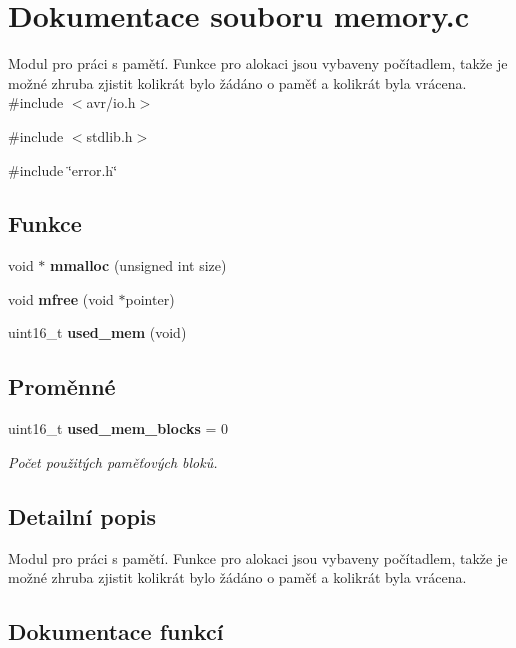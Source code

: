 \section{Dokumentace souboru memory.c}
\label{memory_8c}


Modul pro práci s pamětí. Funkce pro alokaci jsou vybaveny počítadlem, takže je možné zhruba zjistit kolikrát bylo žádáno o paměť a kolikrát byla vrácena.  
{\ttfamily \#include $<$avr/io.h$>$}\par
{\ttfamily \#include $<$stdlib.h$>$}\par
{\ttfamily \#include \char`\"{}error.h\char`\"{}}\par
\subsection*{Funkce}
\begin{DoxyCompactItemize}
\item 
void $\ast$ {\bf mmalloc} (unsigned int size)
\item 
void {\bf mfree} (void $\ast$pointer)
\item 
uint16\_\-t {\bf used\_\-mem} (void)
\end{DoxyCompactItemize}
\subsection*{Proměnné}
\begin{DoxyCompactItemize}
\item 
uint16\_\-t {\bf used\_\-mem\_\-blocks} = 0
\begin{DoxyCompactList}\small\item\em Počet použitých paměťových bloků. \item\end{DoxyCompactList}\end{DoxyCompactItemize}


\subsection{Detailní popis}
Modul pro práci s pamětí. Funkce pro alokaci jsou vybaveny počítadlem, takže je možné zhruba zjistit kolikrát bylo žádáno o paměť a kolikrát byla vrácena. 

\subsection{Dokumentace funkcí}
